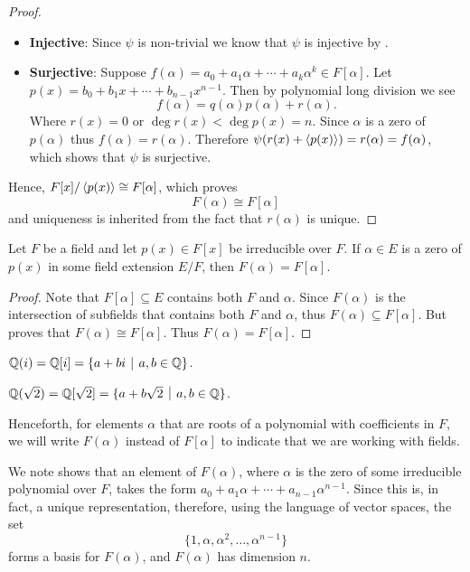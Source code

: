 \begin{proof}
\begin{itemize}
        \item \textbf{Injective}: Since $\psi$ is non-trivial we know that $\psi$ is injective by .

        \item \textbf{Surjective}: Suppose $f(\alpha) = a_0 + a_1\alpha + \cdots + a_k\alpha^k \in F[\alpha]$. Let $p(x) = b_0 + b_1x + \cdots + b_{n-1}x^{n-1}$. Then by polynomial long division we see
        \[
            f(\alpha) = q(\alpha)p(\alpha) + r(\alpha).
        \]
        Where $r(x) = 0$ or $\deg r(x) < \deg p(x) = n$. Since $\alpha$ is a zero of $p(\alpha)$ thus $f(\alpha) = r(\alpha)$. Therefore $\psi(r(x) + \left\langle p(x)\right\rangle) = r(\alpha) = f(\alpha)$, which shows that $\psi$ is surjective.
    \end{itemize}
    Hence, $F[x]/\left\langle p(x)\right\rangle \cong F[\alpha]$, which proves
    \[
        F(\alpha) \cong F[\alpha]
    \]
    and uniqueness is inherited from the fact that $r(\alpha)$ is unique.
\end{proof}
\begin{corollary}
    Let $F$ be a field and let $p(x) \in F[x]$ be irreducible over $F$. If $\alpha \in E$ is a zero of $p(x)$ in some field extension $E/F$, then $F(\alpha) = F[\alpha]$.
\end{corollary}
\begin{proof}
    Note that $F[\alpha] \subseteq E$ contains both $F$ and $\alpha$. Since $F(\alpha)$ is the intersection of subfields that contains both $F$ and $\alpha$, thus $F(\alpha) \subseteq F[\alpha]$. But  proves that $F(\alpha) \cong F[\alpha]$. Thus $F(\alpha) = F[\alpha]$.
\end{proof}

\begin{example}
    $\Q(i) = \Q[i] = \{a + bi \vert a, b \in \Q\}$.
\end{example}
\begin{example}
    $\Q(\sqrt 2) = \Q[\sqrt{2}] = \{a + b\sqrt{2} \vert a, b \in \Q\}$.
\end{example}

Henceforth, for elements $\alpha$ that are roots of a polynomial with coefficients in $F$, we will write $F(\alpha)$ instead of $F[\alpha]$ to indicate that we are working with fields.

We note  shows that an element of $F(\alpha)$, where $\alpha$ is the zero of some irreducible polynomial over $F$, takes the form $a_0+a_1\alpha + \cdots + a_{n-1}\alpha^{n-1}$. Since this is, in fact, a unique representation, therefore, using the language of vector spaces, the set
\[
    \{1, \alpha, \alpha^2, \dots, \alpha^{n-1}\}
\]
forms a basis for $F(\alpha)$, and $F(\alpha)$ has dimension $n$.


